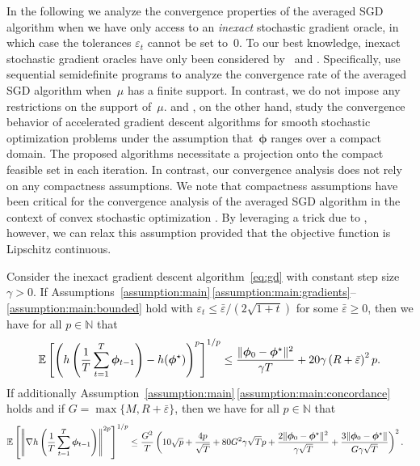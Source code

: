 \documentclass[11pt, a4paper, oneside, reqno]{article}
\begin{document}
	In the following we analyze the convergence properties of the averaged SGD algorithm %
	when we have only access to an {\em inexact} stochastic gradient oracle, in which case the tolerances $\varepsilon_t$ cannot be set to~$0$. To our best knowledge, inexact stochastic gradient oracles have only been considered by~\citet{cohen2018acceleration, hu2020analysis} and \citet{ajalloeian2020analysis}. Specifically, \citet{hu2020analysis} use sequential semidefinite programs to analyze the convergence rate of the averaged SGD algorithm when~$\mu$ has a finite support. In contrast, we do not impose any restrictions on the support of~$\mu$. \citet{cohen2018acceleration} and \citet{ajalloeian2020analysis}, on the other hand, study the convergence behavior of accelerated gradient descent algorithms for smooth stochastic optimization problems under the assumption that~$\bm \phi$ ranges over a compact domain. The proposed algorithms necessitate a projection onto the compact feasible set in each iteration. In contrast, our convergence analysis does not rely on any compactness assumptions. We note that compactness assumptions have been critical for the convergence analysis of the averaged SGD algorithm in the context of convex stochastic optimization \citep{nemirovski2009robust, dekel2012optimal, bubeck2015convex, cohen2018acceleration}. By leveraging a trick due to \citet{bach2013adaptivity}, however, we can relax this assumption provided that the objective function is Lipschitz continuous.
	
	\begin{proposition}
		\label{proposition:moments}
		Consider the inexact gradient descent algorithm~\eqref{eq:gd} with constant step size $\gamma > 0$. If Assumptions~\ref{assumption:main}\,\ref{assumption:main:gradients}--\ref{assumption:main:bounded} hold with $\varepsilon_t \leq {\bar \varepsilon}/{(2\sqrt{1+t})}$ for some $\bar \varepsilon \geq 0$, then we have for all $ p \in \mathbb N$ that
		\begin{align*}
		\mathbb{E} \left[ \left( h \left(\frac{1}{T} \sum_{t=1}^{T} \bm \phi_{t-1} \right) - h(\bm \phi^\star) \right)^p \right]^{1/p}
		\leq \frac{\| \bm \phi_0 - \bm \phi^\star \|^2}{\gamma T} + 20 \gamma \left( R + \bar \varepsilon \right)^2 p.
		\end{align*}
		If additionally Assumption~\ref{assumption:main}\,\ref{assumption:main:concordance} holds and if $G = \max\{ M, R + \bar \varepsilon \}$, then we have for all $ p \in \mathbb N$ that
		\begin{align*}
		\mathbb{E} \left[ \left\| \nabla h \left(\frac{1}{T} \sum_{t=1}^{T} \bm \phi_{t-1} \right) \right\|^{2p} \right]^{1/p}
		&\leq \frac{G^{2}}{T} \left( 10 \sqrt{p} + \frac{4p}{\sqrt{T}} + 80 G^2 \gamma \sqrt{T} p + \frac{2 \| \bm \phi_0 - \bm \phi^\star \|^2}{\gamma \sqrt{T}} + \frac{3 \| \bm \phi_0 - \bm \phi^\star \|}{G \gamma \sqrt{T}} \right)^2.
		\end{align*}
	\end{proposition}
	
\end{document}
